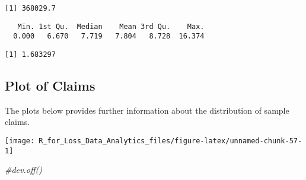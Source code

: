 \documentclass[]{book}
\newenvironment{Shaded}{\begin{snugshade}}{\end{snugshade}}
\newcommand{\KeywordTok}[1]{\textcolor[rgb]{0.13,0.29,0.53}{\textbf{#1}}}
\newcommand{\DataTypeTok}[1]{\textcolor[rgb]{0.13,0.29,0.53}{#1}}
\newcommand{\DecValTok}[1]{\textcolor[rgb]{0.00,0.00,0.81}{#1}}
\newcommand{\StringTok}[1]{\textcolor[rgb]{0.31,0.60,0.02}{#1}}
\newcommand{\CommentTok}[1]{\textcolor[rgb]{0.56,0.35,0.01}{\textit{#1}}}
\newcommand{\OperatorTok}[1]{\textcolor[rgb]{0.81,0.36,0.00}{\textbf{#1}}}
\newcommand{\NormalTok}[1]{#1}
\theoremstyle{definition}
\theoremstyle{definition}
\theoremstyle{definition}
\theoremstyle{remark}
\begin{document}
\begin{verbatim}
[1] 368029.7
\end{verbatim}

\begin{Shaded}
\end{Shaded}

\begin{verbatim}
   Min. 1st Qu.  Median    Mean 3rd Qu.    Max. 
  0.000   6.670   7.719   7.804   8.728  16.374 
\end{verbatim}

\begin{verbatim}
[1] 1.683297
\end{verbatim}

\subsection{Plot of Claims}\label{plot-of-claims}

The plots below provides further information about the distribution of
sample claims.

\begin{Shaded}
\end{Shaded}

\begin{center}\texttt{[image: R\_for\_Loss\_Data\_Analytics\_files/figure-latex/unnamed-chunk-57-1]} \end{center}

\begin{Shaded}
\begin{Highlighting}[]
\CommentTok{#dev.off()}
\end{Highlighting}
\end{Shaded}
\end{document}
